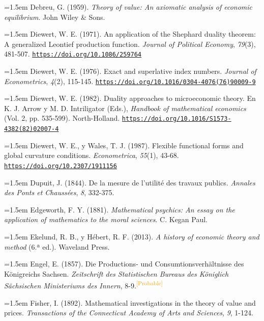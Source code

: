 \documentclass[10pt,a4paper]{article}
\begin{document}
\noindent\hangindent=1.5em Debreu, G. (1959). \textit{Theory of value: An axiomatic analysis of economic equilibrium}. John Wiley \& Sons.

\noindent\hangindent=1.5em Diewert, W. E. (1971). An application of the Shephard duality theorem: A generalized Leontief production function. \textit{Journal of Political Economy}, \textit{79}(3), 481-507. \href{https://doi.org/10.1086/259764}{\nolinkurl{https://doi.org/10.1086/259764}}

\noindent\hangindent=1.5em Diewert, W. E. (1976). Exact and superlative index numbers. \textit{Journal of Econometrics}, \textit{4}(2), 115-145. \href{https://doi.org/10.1016/0304-4076(76)90009-9}{\nolinkurl{https://doi.org/10.1016/0304-4076(76)90009-9}}

\noindent\hangindent=1.5em Diewert, W. E. (1982). Duality approaches to microeconomic theory. En K. J. Arrow y M. D. Intriligator (Eds.), \textit{Handbook of mathematical economics} (Vol. 2, pp. 535-599). North-Holland. \href{https://doi.org/10.1016/S1573-4382(82)02007-4}{\nolinkurl{https://doi.org/10.1016/S1573-4382(82)02007-4}}

\noindent\hangindent=1.5em Diewert, W. E., y Wales, T. J. (1987). Flexible functional forms and global curvature conditions. \textit{Econometrica}, \textit{55}(1), 43-68. \href{https://doi.org/10.2307/1911156}{\nolinkurl{https://doi.org/10.2307/1911156}}

\noindent\hangindent=1.5em Dupuit, J. (1844). De la mesure de l'utilité des travaux publics. \textit{Annales des Ponts et Chaussées}, \textit{8}, 332-375.

\noindent\hangindent=1.5em Edgeworth, F. Y. (1881). \textit{Mathematical psychics: An essay on the application of mathematics to the moral sciences}. C. Kegan Paul.

\noindent\hangindent=1.5em Ekelund, R. B., y Hébert, R. F. (2013). \textit{A history of economic theory and method} (6.ª ed.). Waveland Press.

\noindent\hangindent=1.5em Engel, E. (1857). Die Productions- und Consumtionsverhältnisse des Königreichs Sachsen. \textit{Zeitschrift des Statistischen Bureaus des Königlich Sächsischen Ministeriums des Innern}, 8-9.\textcolor{orange}{\textsuperscript{[Probable]}}

\noindent\hangindent=1.5em Fisher, I. (1892). Mathematical investigations in the theory of value and prices. \textit{Transactions of the Connecticut Academy of Arts and Sciences}, \textit{9}, 1-124.
\end{document}
